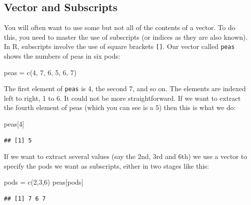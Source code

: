 \documentclass[
]{book}
\newenvironment{Shaded}{\begin{snugshade}}{\end{snugshade}}
\newcommand{\DecValTok}[1]{\textcolor[rgb]{0.00,0.00,0.81}{#1}}
\newcommand{\FunctionTok}[1]{\textcolor[rgb]{0.00,0.00,0.00}{#1}}
\newcommand{\NormalTok}[1]{#1}
\newcommand{\OtherTok}[1]{\textcolor[rgb]{0.56,0.35,0.01}{#1}}
\begin{document}
\hypertarget{vector-and-subscripts}{%
\subsection{Vector and Subscripts}\label{vector-and-subscripts}}

You will often want to use some but not all of the contents of a vector. To do this, you need to master the use of subscripts (or indices as they are also known). In R, subscripts involve the use of square brackets \texttt{{[}{]}}. Our vector called \texttt{peas} shows the numbers of peas in six pods:

\begin{Shaded}
\begin{Highlighting}[]
\NormalTok{peas }\OtherTok{=} \FunctionTok{c}\NormalTok{(}\DecValTok{4}\NormalTok{, }\DecValTok{7}\NormalTok{, }\DecValTok{6}\NormalTok{, }\DecValTok{5}\NormalTok{, }\DecValTok{6}\NormalTok{, }\DecValTok{7}\NormalTok{)}
\end{Highlighting}
\end{Shaded}

The first element of \texttt{peas} is 4, the second 7, and so on. The elements are indexed left to right, 1 to 6. It could not be more straightforward. If we want to extract the fourth element of peas (which you can see is a 5) then this is what we do:

\begin{Shaded}
\begin{Highlighting}[]
\NormalTok{peas[}\DecValTok{4}\NormalTok{]}
\end{Highlighting}
\end{Shaded}

\begin{verbatim}
## [1] 5
\end{verbatim}

If we want to extract several values (say the 2nd, 3rd and 6th) we use a vector to specify the pods we want as subscripts, either in two stages like this:

\begin{Shaded}
\begin{Highlighting}[]
\NormalTok{pods }\OtherTok{=} \FunctionTok{c}\NormalTok{(}\DecValTok{2}\NormalTok{,}\DecValTok{3}\NormalTok{,}\DecValTok{6}\NormalTok{)}
\NormalTok{peas[pods]}
\end{Highlighting}
\end{Shaded}

\begin{verbatim}
## [1] 7 6 7
\end{verbatim}
\end{document}
